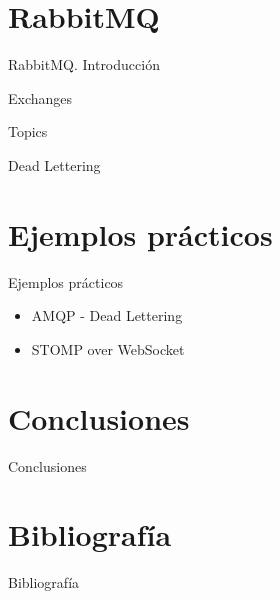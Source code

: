 \documentclass{beamer}
\begin{document}
  \section{RabbitMQ}
  \begin{frame}{RabbitMQ. Introducción}

  \end{frame}

  \begin{frame}{Exchanges}

  \end{frame}

  \begin{frame}{Topics}

  \end{frame}

  \begin{frame}{Dead Lettering}

  \end{frame}

  \section{Ejemplos prácticos}
  \begin{frame}{Ejemplos prácticos}
    \begin{itemize}
      \item AMQP - Dead Lettering
      \item STOMP over WebSocket
    \end{itemize}
  \end{frame}

  \section{Conclusiones}
  \begin{frame}{Conclusiones}

  \end{frame}

  \section{Bibliografía}
  \begin{frame}{Bibliografía}

  \end{frame}
\end{document}
